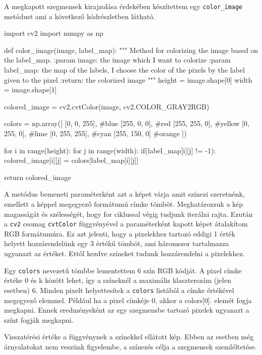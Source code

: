 A megkapott szegmensek kirajzolása érdekében készítettem egy \texttt{color\_image} metódust ami a következő kódrészletben látható.

\begin{python}
import cv2
import numpy as np

def color_image(image, label_map):
    """
    Method for colorizing the image based on the label_map.
    :param image: the image which I want to colorize
    :param label_map: the map of the labels, I choose the color
        of the pixels by the label given to the pixel
    :return: the colorized image
    """
    height = image.shape[0]
    width = image.shape[1]

    colored_image = cv2.cvtColor(image, cv2.COLOR_GRAY2RGB)

    colors = np.array([
        [0, 0, 255],   #blue
        [255, 0, 0],   #red
        [255, 255, 0], #yellow
        [0, 255, 0],   #lime
        [0, 255, 255], #cyan
        [255, 150, 0]  #orange
    ])

    for i in range(height):
        for j in range(width):
            if(label_map[i][j] != -1):
                colored_image[i][j] = colors[label_map[i][j]]

    return colored_image
\end{python}

A metódus bemeneti paraméterként azt a képet várja amit színezi szeretnénk, emellett a képpel megegyező formátumú címke tömböt. Meghatározzuk a kép magasságát és szélességét, hogy for ciklussal végig tudjunk iterálni rajta. Ezután a \texttt{cv2} csomag \texttt{cvtColor} függvényével a paraméterként kapott képet átalakítom RGB formátumúra. Ez azt jelenti, hogy a pixelekhez tartozó eddigi 1 érték helyett hozzárendelünk egy 3 értékű tömböt, ami háromszor tartalmazza ugyanazt az értéket. Ettől kezdve színeket tudunk hozzárendelni a pixelekhez.

Egy \texttt{colors} nevezetű tömbbe lementettem 6 szín RGB kódját. A pixel címke értéke 0 és k között lehet, így a színeknél a maximális klaszterszám (jelen esetben) 6. Minden pixelt helyettesítek a \texttt{colors} listából a címke értékével megegyező elemmel. Például ha a pixel címkéje 0, akkor a colors[0]. elemét fogja megkapni. Ennek eredményeként az egy szegmensbe tartozó pixelek ugyanazt a színt fogják megkapni.

Visszatérési értéke a függvénynek a színekkel ellátott kép. Ebben az esetben még árnyalatokat nem veszünk figyelembe, a színezés célja a szegmensek szemléltetése.


